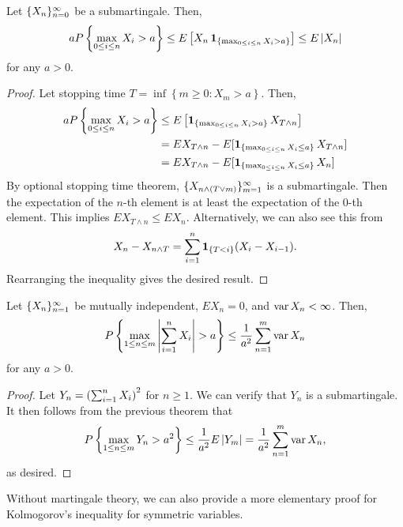 \documentclass[a4paper]{article}
\begin{document}
\begin{thm}
  Let $\{ X_n \}_{n=0}^\infty$ be a submartingale. Then,
  \[
    a P \left\{ \max_{0 \leq i \leq n} X_i > a \right\}
    \leq E \left[ X_n \operatorname{\mathbf{1}}_{\{\max_{0 \leq i \leq n} X_i > a \}} \right]
    \leq E \left\lvert X_n\right\rvert
  \]
  for any $a > 0$.
\end{thm}

\begin{proof}
  Let stopping time $T = \inf \left\{ m \geq 0 : X_m > a \right\}$.
  Then,
  \begin{align*}
    a P \left\{ \max_{0 \leq i \leq n} X_i > a \right\}
     & \leq E \left[ \operatorname{\mathbf{1}}_{\{ \max_{0 \leq i \leq n}
                  X_i > a \}} X_{T \wedge n} \right]                \\
     & = E X_{T \wedge n} -
    E [\operatorname{\mathbf{1}}_{\{\max_{0 \leq i \leq n} X_i \leq a\}} X_{T \wedge n}] \\
     & = E X_{T \wedge n} -
    E [\operatorname{\mathbf{1}}_{\{\max_{0 \leq i \leq n} X_i \leq a\}} X_{n}]          \\
  \end{align*}
  By optional stopping time theorem, $\{ X_{n \wedge (T \vee m)} \}_{m=1}^\infty$
  is a submartingale. Then the expectation of
  the $n$-th element is at least the expectation of
  the $0$-th element. This implies $E X_{T \wedge n} \leq E X_n$.
  Alternatively, we can also see this from
  \[
    X_n - X_{n \wedge T} = \sum_{i=1}^n \operatorname{\mathbf{1}}_{\{T < i\}} (X_i - X_{i - 1}).
  \]
  Rearranging the inequality gives the desired result.

\end{proof}

\begin{cor}
  Let $\{ X_n \}_{n=1}^\infty$ be mutually independent, $E X_n = 0$,
  and $\operatorname{var} X_n < \infty$. Then,
  \[
    P \left\{ \max_{1 \leq n \leq m} \left\lvert \sum_{i=1}^n X_i\right\rvert > a \right\}
    \leq \frac{1}{a^2} \sum_{n=1}^m \operatorname{var} X_n
  \]
  for any $a > 0$.
\end{cor}

\begin{proof}
  Let $Y_n = \left( \sum_{i=1}^n X_i \right)^2$ for $n \geq 1$.
  We can verify that $Y_n$ is a submartingale. It then
  follows from the previous theorem that
  \[
    P \left\{ \max_{1 \leq n \leq m} Y_n > a^2 \right\}
    \leq \frac{1}{a^2} E \left\lvert Y_m\right\rvert = \frac{1}{a^2} \sum_{n=1}^m \operatorname{var} X_n,
  \]
  as desired.
\end{proof}

Without martingale theory, we can also provide a more elementary
proof for Kolmogorov's inequality for symmetric variables.
\end{document}
